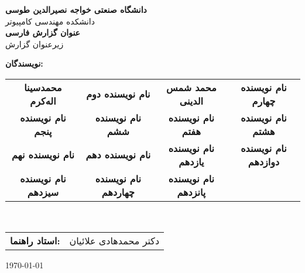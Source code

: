 \begin{titlepage}
    \centering
    
    \vspace*{2cm}
    
    {\Large \textbf{دانشگاه صنعتی خواجه نصیرالدین طوسی}}\\[0.5cm]
    {\large دانشکده مهندسی کامپیوتر}\\[1cm]
    
    {\Huge \textbf{عنوان گزارش فارسی}}\\[0.5cm]
    {\Large زیرعنوان گزارش}\\[1cm]
    
    {\large
        \textbf{نویسندگان:}\\[0.2cm]
        \begin{tabular}{cccc}
            \textbf{محمدسینا اله‌کرم} & \textbf{نام نویسنده دوم} &
            \textbf{محمد شمس الدینی} & \textbf{نام نویسنده چهارم} \\ 
            \textbf{نام نویسنده پنجم} & \textbf{نام نویسنده ششم} &
            \textbf{نام نویسنده هفتم} & \textbf{نام نویسنده هشتم} \\
            \textbf{نام نویسنده نهم} & \textbf{نام نویسنده دهم} &
            \textbf{نام نویسنده یازدهم} & \textbf{نام نویسنده دوازدهم} \\
            \textbf{نام نویسنده سیزدهم} & \textbf{نام نویسنده چهاردهم} &
            \textbf{نام نویسنده پانزدهم} \\
            
        \end{tabular}
        \\[1.5cm]
        \begin{tabular}{rl}
            \textbf{استاد راهنما:} & دکتر محمدهادی علائیان \\[0.3cm]
        \end{tabular}
    }
    
    \vfill
    
    {\large \today}
    
\end{titlepage}

\newpage

